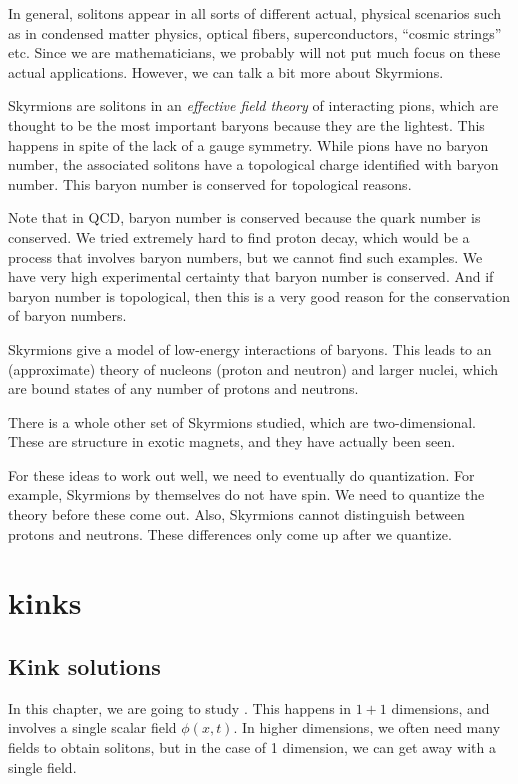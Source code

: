 \documentclass[a4paper]{article}
\begin{document}
In general, solitons appear in all sorts of different actual, physical scenarios such as in condensed matter physics, optical fibers, superconductors, ``cosmic strings'' etc. Since we are mathematicians, we probably will not put much focus on these actual applications. However, we can talk a bit more about Skyrmions.

Skyrmions are solitons in an \emph{effective field theory} of interacting pions, which are thought to be the most important baryons because they are the lightest. This happens in spite of the lack of a gauge symmetry. While pions have no baryon number, the associated solitons have a topological charge identified with baryon number. This baryon number is conserved for topological reasons.

Note that in QCD, baryon number is conserved because the quark number is conserved. We tried extremely hard to find proton decay, which would be a process that involves baryon numbers, but we cannot find such examples. We have very high experimental certainty that baryon number is conserved. And if baryon number is topological, then this is a very good reason for the conservation of baryon numbers.

Skyrmions give a model of low-energy interactions of baryons. This leads to an (approximate) theory of nucleons (proton and neutron) and larger nuclei, which are bound states of any number of protons and neutrons. %

There is a whole other set of Skyrmions studied, which are two-dimensional. These are structure in exotic magnets, and they have actually been seen.

For these ideas to work out well, we need to eventually do quantization. For example, Skyrmions by themselves do not have spin. We need to quantize the theory before these come out. Also, Skyrmions cannot distinguish between protons and neutrons. These differences only come up after we quantize.
\section{ kinks}
\subsection{Kink solutions}
In this chapter, we are going to study . This happens in $1 + 1$ dimensions, and involves a single scalar field $\phi(x, t)$. In higher dimensions, we often need many fields to obtain solitons, but in the case of 1 dimension, we can get away with a single field.
\end{document}
